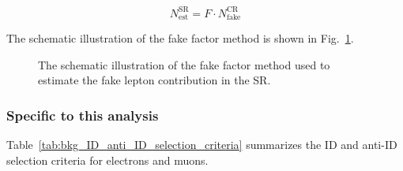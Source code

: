 \begin{equation}
    N^\mathrm{SR}_\mathrm{est} = F \cdot N^\mathrm{CR}_\mathrm{fake}
    \label{eq:bkg_estimated_fake_leptons}
\end{equation}

The schematic illustration of the fake factor method is shown in Fig.~\ref{fig:bkg_fake_factor_method}.

\begin{figure}[htb]
    \begin{center}
        
        \caption{The schematic illustration of the fake factor method used to estimate the fake lepton contribution in the SR.}
        \label{fig:bkg_fake_factor_method}
    \end{center}
\end{figure}


\subsubsection{Specific to this analysis}
\label{subsubsec:bkg_fake_specific}
Table~\ref{tab:bkg_ID_anti_ID_selection_criteria} summarizes the ID and anti-ID selection criteria for electrons and muons.

\begin{table}[htbp]
    \caption{The ID and anti-ID selection criteria for electrons and muons.}
    \label{tab:bkg_ID_anti_ID_selection_criteria}
\end{table}

